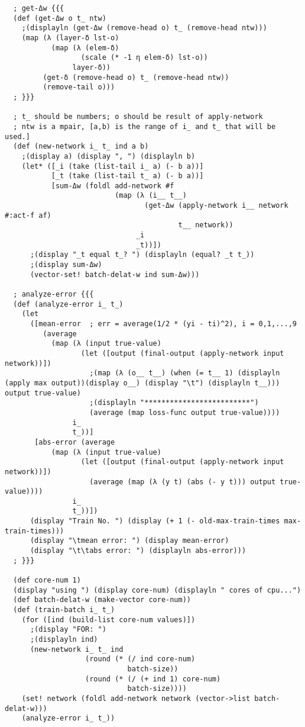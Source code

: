 \documentclass{article}
\begin{document}
\begin{lstlisting}
  ; get-Δw {{{
  (def (get-Δw o t_ ntw)
    ;(displayln (get-Δw (remove-head o) t_ (remove-head ntw)))
    (map (λ (layer-δ lst-o)
           (map (λ (elem-δ)
                  (scale (* -1 η elem-δ) lst-o))
                layer-δ))
         (get-δ (remove-head o) t_ (remove-head ntw))
         (remove-tail o)))
  ; }}}

  ; t_ should be numbers; o should be result of apply-network
  ; ntw is a mpair, [a,b) is the range of i_ and t_ that will be used.]
  (def (new-network i_ t_ ind a b)
    ;(display a) (display ", ") (displayln b)
    (let* ([_i (take (list-tail i_ a) (- b a))]
           [_t (take (list-tail t_ a) (- b a))]
           [sum-Δw (foldl add-network #f
                          (map (λ (i__ t__)
                                 (get-Δw (apply-network i__ network #:act-f af)
                                         t__ network))
                               _i
                               _t))])
      ;(display "_t equal t_? ") (displayln (equal? _t t_))
      ;(display sum-Δw)
      (vector-set! batch-delat-w ind sum-Δw)))

  ; analyze-error {{{
  (def (analyze-error i_ t_)
    (let
      ([mean-error  ; err = average(1/2 * (yi - ti)^2), i = 0,1,...,9
         (average
           (map (λ (input true-value)
                  (let ([output (final-output (apply-network input network))])
                    ;(map (λ (o__ t__) (when (= t__ 1) (displayln (apply max output))(display o__) (display "\t") (displayln t__))) output true-value)
                    ;(displayln "*************************")
                    (average (map loss-func output true-value))))
                i_
                t_))]
       [abs-error (average
           (map (λ (input true-value)
                  (let ([output (final-output (apply-network input network))])
                    (average (map (λ (y t) (abs (- y t))) output true-value))))
                i_
                t_))])
      (display "Train No. ") (display (+ 1 (- old-max-train-times max-train-times)))
      (display "\tmean error: ") (display mean-error)
      (display "\t\tabs error: ") (displayln abs-error)))
  ; }}}

  (def core-num 1)
  (display "using ") (display core-num) (displayln " cores of cpu...")
  (def batch-delat-w (make-vector core-num))
  (def (train-batch i_ t_)
    (for ([ind (build-list core-num values)])
      ;(display "FOR: ")
      ;(displayln ind)
      (new-network i_ t_ ind
                   (round (* (/ ind core-num)
                             batch-size))
                   (round (* (/ (+ ind 1) core-num)
                             batch-size))))
    (set! network (foldl add-network network (vector->list batch-delat-w)))
    (analyze-error i_ t_))


\end{lstlisting}
\end{document}
